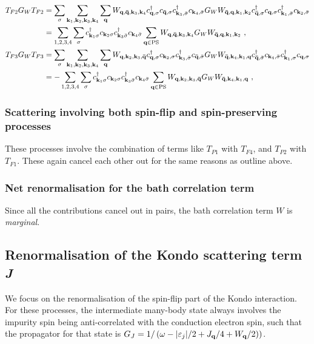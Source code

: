\begin{equation}\begin{aligned}
	T_{F2} G_W T_{F2} &= \sum_\sigma\sum_{{\bf k}_1, {\bf k}_2, {\bf k}_3, {\bf k}_4} \sum_{\bf q}W_{{\bf q},{\bf \bar q},{\bf k}_3,{\bf k}_4} c^\dagger_{{\bf q},\sigma}c_{{\bf \bar q},\sigma}c^\dagger_{{\bf k}_3,\bar\sigma}c_{{\bf k}_4,\bar\sigma} G_W W_{{\bf \bar q},{\bf q},{\bf k}_1,{\bf k}_2} c^\dagger_{{\bf \bar q},\sigma}c_{{\bf q},\sigma}c^\dagger_{{\bf k}_1,\bar\sigma}c_{{\bf k}_2,\bar\sigma} \\
							  &= \sum_{1,2,3,4}\sum_\sigma c^\dagger_{{\bf k}_1\sigma} c_{{\bf k}_2\sigma} c^\dagger_{{\bf k}_3\bar\sigma} c_{{\bf k}_4\bar \sigma} \sum_{\bf q \in \text{PS}} W_{{\bf q},{\bf \bar q},{\bf k}_3,{\bf k}_4} G_W W_{{\bf \bar q},{\bf q},{\bf k}_1,{\bf k}_2}~,\\
	T_{F3} G_W T_{F3} &= \sum_\sigma\sum_{{\bf k}_1, {\bf k}_2, {\bf k}_3, {\bf k}_4} \sum_{\bf q} W_{{\bf q},{\bf k}_2,{\bf k}_3,{\bf \bar q}} c^\dagger_{{\bf q},\sigma}c_{{\bf k}_2,\sigma}c^\dagger_{{\bf k}_3,\bar\sigma}c_{{\bf \bar q},\bar\sigma} G_W W_{{\bf \bar q},{\bf k}_4,{\bf k}_1,{\bf q}} c^\dagger_{{\bf \bar q},\bar\sigma} c_{{\bf k}_4,\bar\sigma} c^\dagger_{{\bf k}_1,\sigma} c_{{\bf q},\sigma} \\
							  &= -\sum_{1,2,3,4}\sum_\sigma c^\dagger_{{\bf k}_1\sigma} c_{{\bf k}_2\sigma} c^\dagger_{{\bf k}_3\bar\sigma} c_{{\bf k}_4\bar \sigma} \sum_{\bf q \in \text{PS}} W_{{\bf q},{\bf k}_2,{\bf k}_3,{\bf \bar q}} G_W W_{{\bf \bar q},{\bf k}_4,{\bf k}_1,{\bf q}}~,
\end{aligned}\end{equation}

\subsubsection*{Scattering involving both spin-flip and spin-preserving processes}
These processes involve the combination of terms like \(T_{P1}\) with \(T_{F4}\), and \(T_{P2}\) with \(T_{F1}\). These again cancel each other out for the same reasons as outline above.

\subsubsection*{Net renormalisation for the bath correlation term}
Since all the contributions cancel out in pairs, the bath correlation term \(W\) is {\it marginal}.

\subsection{Renormalisation of the Kondo scattering term {\it J}}
We focus on the renormalisation of the spin-flip part of the Kondo interaction. For these processes, the intermediate many-body state always involves the impurity spin being anti-correlated with the conduction electron spin, such that the propagator for that state is \(G_J = 1/\left(\omega - |\varepsilon_j|/2 + J_{\bf q}/4 + W_{\bf q}/2)\right) \).
